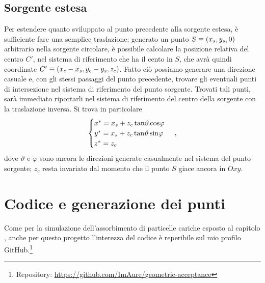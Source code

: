         \subsection{Sorgente estesa}
            Per estendere quanto sviluppato al punto precedente alla sorgente estesa, è sufficiente fare una semplice traslazione: generato un punto $S\equiv\pqty{x_s, y_s, 0}$ arbitrario nella sorgente circolare, è possibile calcolare la posizione relativa del centro $C'$, nel sistema di riferimento che ha il cento in $S$, che avrà quindi coordinate $C'\equiv\pqty{x_c - x_s, y_c - y_s, z_c}$. Fatto ciò possiamo generare una direzione casuale e, con gli stessi passaggi del punto precedente, trovare gli eventuali punti di intersezione nel sistema di riferimento del punto sorgente. Trovati tali punti, sarà immediato riportarli nel sistema di riferimento del centro della sorgente con la traslazione inversa. Si trova in particolare
            \begin{equation*}
                \begin{cases}
                    x^* = x_s + z_c\tan\!\vartheta\cos\!\varphi \\
                    y^* = x_s + z_c\tan\!\vartheta\sin\!\varphi \\
                    z^* = z_c
                \end{cases}
                \,,
            \end{equation*}
            dove $\vartheta$ e $\varphi$ sono ancora le direzioni generate casualmente nel sistema del punto sorgente; $z_c$ resta invariato dal momento che il punto $S$ giace ancora in $Oxy$.
    
    \section{Codice e generazione dei punti}
        Come per la simulazione dell'assorbimento di particelle cariche esposto al capitolo , anche per questo progetto l'interezza del codice è reperibile sul mio profilo GitHub.\footnote{Repository: \url{https://github.com/ImAure/geometric-acceptance}}

